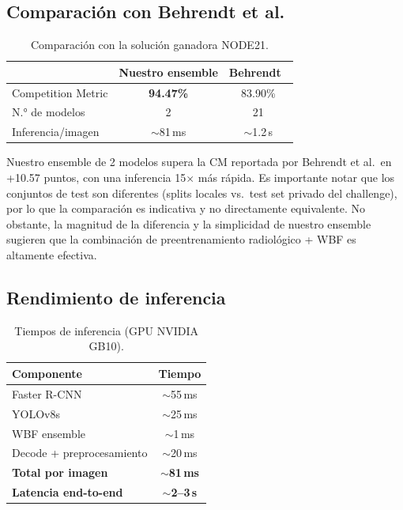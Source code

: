 \documentclass[conference]{IEEEtran}
\begin{document}
\subsection{Comparación con Behrendt et al.}

\begin{table}[!t]
\centering
\caption{Comparación con la solución ganadora NODE21.}
\label{tab:vsganador}
\renewcommand{\arraystretch}{1.1}
\begin{tabular}{lcc}
\toprule
& \textbf{Nuestro ensemble} & \textbf{Behrendt~\cite{behrendt2023}} \\
\midrule
Competition Metric & \textbf{94.47\%} & 83.90\% \\
N.° de modelos & 2 & 21 \\
Inferencia/imagen & $\sim$81\,ms & $\sim$1.2\,s \\
\bottomrule
\end{tabular}
\end{table}

Nuestro ensemble de 2 modelos supera la CM reportada por Behrendt et al.\ en +10.57 puntos, con una inferencia 15$\times$ más rápida. Es importante notar que los conjuntos de test son diferentes (splits locales vs.\ test set privado del challenge), por lo que la comparación es indicativa y no directamente equivalente. No obstante, la magnitud de la diferencia y la simplicidad de nuestro ensemble sugieren que la combinación de preentrenamiento radiológico + WBF es altamente efectiva.

\subsection{Rendimiento de inferencia}

\begin{table}[!t]
\centering
\caption{Tiempos de inferencia (GPU NVIDIA GB10).}
\label{tab:inferencia}
\renewcommand{\arraystretch}{1.1}
\begin{tabular}{lc}
\toprule
\textbf{Componente} & \textbf{Tiempo} \\
\midrule
Faster R-CNN & $\sim$55\,ms \\
YOLOv8s & $\sim$25\,ms \\
WBF ensemble & $\sim$1\,ms \\
Decode + preprocesamiento & $\sim$20\,ms \\
\midrule
\textbf{Total por imagen} & $\sim$\textbf{81\,ms} \\
\textbf{Latencia end-to-end} & $\sim$\textbf{2--3\,s} \\
\bottomrule
\end{tabular}
\end{table}
\end{document}

